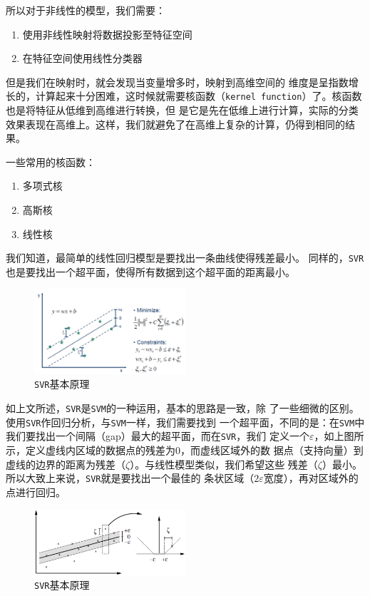 \documentclass[11pt,a4paper]{elegantpaper}
\begin{document}
\begin{multicols}{2}
所以对于非线性的模型，我们需要：

\begin{enumerate}
  \item 使用非线性映射将数据投影至特征空间
  \item 在特征空间使用线性分类器
\end{enumerate}

但是我们在映射时，就会发现当变量增多时，映射到高维空间的
维度是呈指数增长的，计算起来十分困难，这时候就需要核函数（\lstinline{kernel function}）了。核函数也是将特征从低维到高维进行转换，但
是它是先在低维上进行计算，实际的分类效果表现在高维上。这样，我们就避免了在高维上复杂的计算，仍得到相同的结果。

一些常用的核函数：

\begin{enumerate}
  \item 多项式核
  \item 高斯核
  \item 线性核
\end{enumerate}

我们知道，最简单的线性回归模型是要找出一条曲线使得残差最小。
同样的，\lstinline{SVR}也是要找出一个超平面，使得所有数据到这个超平面的距离最小。

\begin{figure}[H]
  \centering
  \includegraphics[width=0.5\textwidth]{images/SVR.png}
  \caption{\lstinline{SVR}基本原理} 
\end{figure}

如上文所述，\lstinline{SVR}是\lstinline{SVM}的一种运用，基本的思路是一致，除
了一些细微的区别。使用\lstinline{SVR}作回归分析，与\lstinline{SVM}一样，我们需要找到
一个超平面，不同的是：在\lstinline{SVM}中我们要找出一个间隔（gap）最大的超平面，而在\lstinline{SVR}，我们
定义一个$\varepsilon$，如上图所示，定义虚线内区域的数据点的残差为$0$，而虚线区域外的数
据点（支持向量）到虚线的边界的距离为残差（$\zeta$）。与线性模型类似，我们希望这些
残差（$\zeta$）最小。所以大致上来说，\lstinline{SVR}就是要找出一个最佳的
条状区域（$2\varepsilon$宽度），再对区域外的点进行回归。

\begin{figure}[H]
  \centering
  \includegraphics[width=0.5\textwidth]{images/SR.png}
  \caption{\lstinline{SVR}基本原理} 
\end{figure}


\end{multicols}
\end{document}
